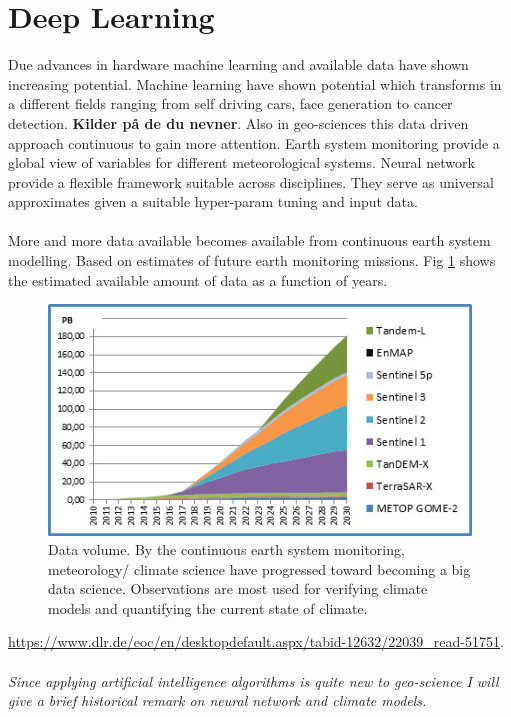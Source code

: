 \section{Deep Learning}
Due advances in hardware machine learning and available data have shown increasing potential. Machine learning have shown potential which transforms in a different fields ranging from self driving cars, face generation to cancer detection. \textbf{Kilder på de du nevner}. Also in geo-sciences this data driven approach continuous to gain more attention. Earth system monitoring provide a global view of variables for different meteorological systems. Neural network provide a flexible framework suitable across disciplines. They serve as universal approximates given a suitable hyper-param tuning and input data.
\\ \\ 
More and more data available becomes available from continuous earth system modelling. Based on estimates of future earth monitoring missions. Fig \ref{fig:data_volum_sat} shows the estimated available amount of data as a function of years.
\begin{figure}
    \centering
    \includegraphics{Chapter1_Intro/images/Datenvolumen_D-SDA.jpg}
    \caption{Data volume. By the continuous earth system monitoring, meteorology/ climate science have progressed toward becoming a big data science. Observations are most used for verifying climate models and quantifying the current state of climate. }
    \label{fig:data_volum_sat}
\end{figure}
\href{https://www.dlr.de/eoc/en/desktopdefault.aspx/tabid-12632/22039_read-51751}{https://www.dlr.de/eoc/en/desktopdefault.aspx/tabid-12632/22039{\_}read-51751}.
\\ \\ 
\textit{Since applying artificial intelligence algorithms is quite new to geo-science I will give a brief historical remark on neural network and climate models.}
